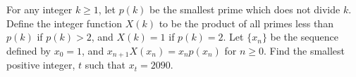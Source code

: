 For any integer $k\ge1$, let $p(k)$ be the smallest prime which does not divide $k$. Define the integer function $X(k)$ to be the product of all primes less than $p(k)$ if $p(k)>2$, and $X(k)=1$ if $p(k)=2$. Let $\{x_n\}$ be the sequence defined by $x_0=1$, and $x_{n+1}X(x_n)=x_np(x_n)$ for $n\ge0$. Find the smallest positive integer, $t$ such that $x_t=2090$.